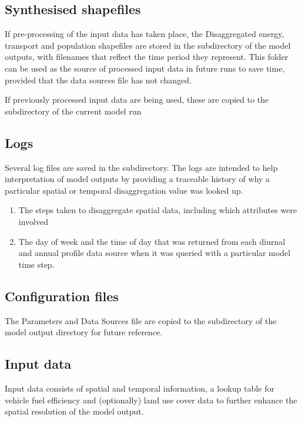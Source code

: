 \documentclass[letterpaper,10pt,english]{sphinxmanual}
\begin{document}
\subsection{Synthesised shapefiles}
\label{\detokenize{OtherManuals/LQF_Manual:synthesised-shapefiles}}
If pre-processing of the input data has taken place, the Disaggregated
energy, transport and population shapefiles are stored in the
 subdirectory of the model outputs, with filenames
that reflect the time period they represent. This folder can be used as
the source of processed input data in future runs to save time, provided
that the data sources file has not changed.

If previously processed input data are being used, these are copied to
the  subdirectory of the current model run


\subsection{Logs}
\label{\detokenize{OtherManuals/LQF_Manual:logs}}
Several log files are saved in the  subdirectory. The logs are
intended to help interpretation of model outputs by providing a
traceable history of why a particular spatial or temporal disaggregation
value was looked up.
\begin{enumerate}
\item {} 
The steps taken to disaggregate spatial data, including which
attributes were involved

\item {} 
The day of week and the time of day that was returned from each
diurnal and annual profile data source when it was queried with a
particular model time step.

\end{enumerate}


\subsection{Configuration files}
\label{\detokenize{OtherManuals/LQF_Manual:configuration-files}}
The Parameters and Data Sources file are copied to the 
subdirectory of the model output directory for future reference.


\subsection{Input data}
\label{\detokenize{OtherManuals/LQF_Manual:input-data}}
Input data consists of spatial and temporal information, a lookup table
for vehicle fuel efficiency and (optionally) land use cover data to
further enhance the spatial resolution of the model output.
\end{document}
